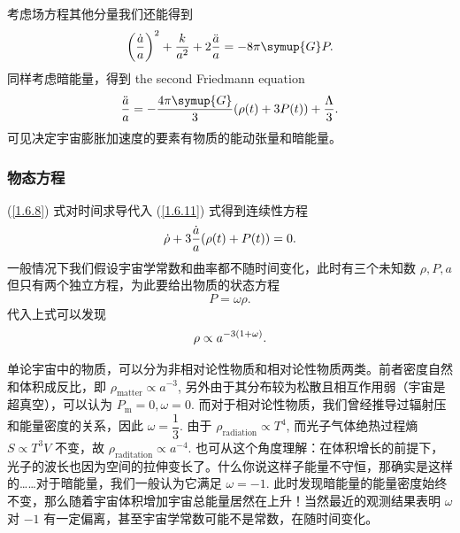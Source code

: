 \documentclass[../天体物理基础.tex]{subfiles}
\begin{document}
考虑场方程其他分量我们还能得到
\begin{equation}
\mleft(\frac{\dot{a}}{a}\mright)^{2}+\frac{k}{a^{2}}+2\frac{\ddot{a}}{a}=-8\pi\symup{G}P.\\
\end{equation}
同样考虑暗能量，得到 the second Friedmann equation
\begin{equation}
\frac{\ddot{a}}{a}=-\frac{4\pi\symup{G}}{3}\mleft(\rho\mleft(t\mright)+3P\mleft(t\mright)\mright)+\frac{\Lambda}{3}.\label{1.6.11}
\end{equation}
可见决定宇宙膨胀加速度的要素有物质的能动张量和暗能量。

\subsubsection{物态方程}
(\ref{1.6.8}) 式对时间求导代入 (\ref{1.6.11}) 式得到连续性方程
\begin{equation}
\dot{\rho}+3\frac{\dot{a}}{a}\mleft(\rho\mleft(t\mright)+P\mleft(t\mright)\mright)=0.
\end{equation}
一般情况下我们假设宇宙学常数和曲率都不随时间变化，此时有三个未知数 $\rho, P, a$ 但只有两个独立方程，为此要给出物质的状态方程
\begin{equation}
P=\omega\rho.
\end{equation}
代入上式可以发现
\begin{equation}
\rho\propto{}a^{-3\mleft(1+\omega\mright)}.
\end{equation}

单论宇宙中的物质，可以分为非相对论性物质和相对论性物质两类。前者密度自然和体积成反比，即 $\rho_{\mathrm{matter}}\propto a^{-3}$, 另外由于其分布较为松散且相互作用弱（宇宙是超真空），可以认为 $P_{\mathrm{m}}=0,\omega=0$. 而对于相对论性物质，我们曾经推导过辐射压和能量密度的关系，因此 $\omega=\dfrac{1}{3}$. 由于 $\rho_{\mathrm{radiation}}\propto{}T^{4}$, 而光子气体绝热过程熵 $S\propto{}T^{3}V$ 不变，故 $\rho_{\mathrm{raditation}}\propto{}a^{-4}$. 也可从这个角度理解：在体积增长的前提下，光子的波长也因为空间的拉伸变长了。什么你说这样子能量不守恒，那确实是这样的……对于暗能量，我们一般认为它满足 $\omega=-1$. 此时发现暗能量的能量密度始终不变，那么随着宇宙体积增加宇宙总能量居然在上升！当然最近的观测结果表明 $\omega$ 对 $-1$ 有一定偏离，甚至宇宙学常数可能不是常数，在随时间变化。
\end{document}
